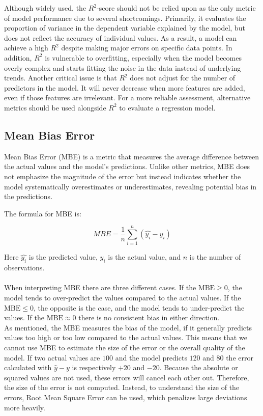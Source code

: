 \noindent Although widely used, the $R^2$-score should not be relied upon as the only metric of model performance due to several shortcomings. Primarily, it evaluates the proportion of variance in the dependent variable explained by the model, but does not reflect the accuracy of individual values. As a result, a model can achieve a high $R^2$ despite making major errors on specific data points. In addition, $R^2$ is vulnerable to overfitting, especially when the model becomes overly complex and starts fitting the noise in the data instead of underlying trends. Another critical issue is that $R^2$ does not adjust for the number of predictors in the model. It will never decrease when more features are added, even if those features are irrelevant. For a more reliable assessment, alternative metrics should be used alongside $R^2$ to evaluate a regression model. 
\newpage

\subsection{Mean Bias Error}
Mean Bias Error (MBE) is a metric that measures the average difference between the actual values and the model's predictions. Unlike other metrics, MBE does not emphasize the magnitude of the error but instead indicates whether the model systematically overestimates or underestimates, revealing potential bias in the predictions.

The formula for MBE is:

$$MBE=\frac{1}{n}\sum_{i=1}^{n}(\hat{y_i}-y_i)$$

\noindent Here $\hat{y_i}$ is the predicted value, $y_i$ is the actual value, and $n$ is the number of observations.
\\\\

When interpreting MBE there are three different cases. If the $\text{MBE}\geq 0$, the model tends to over-predict the values compared to the actual values. If the $\text{MBE}\leq0$, the opposite is the case, and the model tends to under-predict the values. If the $\text{MBE}\approx0$ there is no consistent bias in either direction.
\\

\noindent As mentioned, the MBE measures the bias of the model, if it generally predicts values too high or too low compared to the actual values. This means that we cannot use MBE to estimate the size of the error or the overall quality of the model. If two actual values are $100$ and the model predicts $120$ and $80$ the error calculated with $\hat{y}-y$ is respectively $+20$ and $-20$. Because the absolute or squared values are not used, these errors will cancel each other out. Therefore, the size of the error is not computed. Instead, to understand the size of the errors, Root Mean Square Error can be used, which penalizes large deviations more heavily.

